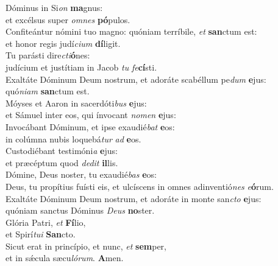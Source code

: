 \evenverse Dóminus in Si\textit{on} \textbf{ma}gnus:~\*\\
\evenverse et excélsus super \textit{om}\textit{nes} \textbf{pó}pulos.\\
\oddverse Confiteántur nómini tuo magno: quóniam terríbile, \textit{et} \textbf{san}ctum est:~\*\\
\oddverse et honor regis judí\textit{ci}\textit{um} \textbf{dí}ligit.\\
\evenverse Tu parásti dire\textit{cti}\textbf{ó}nes:~\*\\
\evenverse judícium et justítiam in Jacob \textit{tu} \textit{fe}\textbf{cí}sti.\\
\oddverse Exaltáte Dóminum Deum nostrum, et adoráte scabéllum pe\textit{dum} \textbf{e}jus:~\*\\
\oddverse quó\textit{ni}\textit{am} \textbf{san}ctum est.\\
\evenverse Móyses et Aaron in sacerdóti\textit{bus} \textbf{e}jus:~\*\\
\evenverse et Sámuel inter eos, qui ínvocant \textit{no}\textit{men} \textbf{e}jus:\\
\oddverse Invocábant Dóminum, et ipse exaudié\textit{bat} \textbf{e}os:~\*\\
\oddverse in colúmna nubis loquebá\textit{tur} \textit{ad} \textbf{e}os.\\
\evenverse Custodiébant testimóni\textit{a} \textbf{e}jus:~\*\\
\evenverse et præcéptum quod \textit{de}\textit{dit} \textbf{il}lis.\\
\oddverse Dómine, Deus noster, tu exaudié\textit{bas} \textbf{e}os:~\*\\
\oddverse Deus, tu propítius fuísti eis, et ulcíscens in omnes adinventió\textit{nes} \textit{e}\textbf{ó}rum.\\
\evenverse Exaltáte Dóminum Deum nostrum, et adoráte in monte san\textit{cto} \textbf{e}jus:~\*\\
\evenverse quóniam sanctus Dóminus \textit{De}\textit{us} \textbf{no}ster.\\
\oddverse Glória Patri, \textit{et} \textbf{Fí}lio,~\*\\
\oddverse et Spirí\textit{tu}\textit{i} \textbf{San}cto.\\
\evenverse Sicut erat in princípio, et nunc, \textit{et} \textbf{sem}per,~\*\\
\evenverse et in sǽcula sæcu\textit{ló}\textit{rum}. \textbf{A}men.\\
